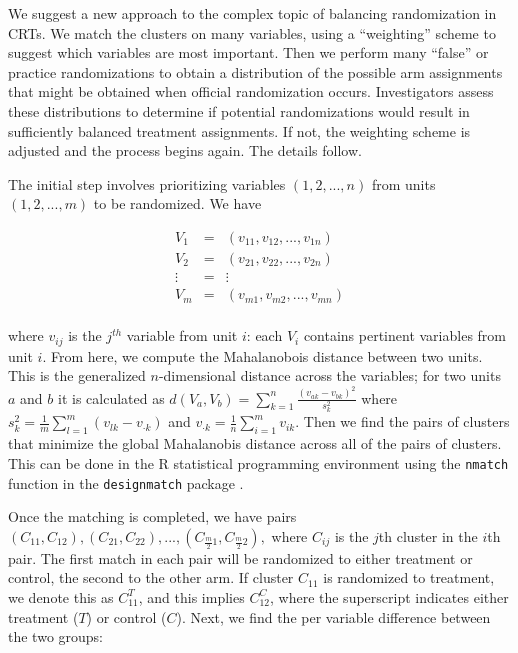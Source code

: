 \documentclass[]{article}
\begin{document}
We suggest a new approach to the complex topic of balancing
randomization in CRTs. We match the clusters on many variables, using a
``weighting'' scheme to suggest which variables are most important. Then
we perform many ``false'' or practice randomizations to obtain a
distribution of the possible arm assignments that might be obtained when
official randomization occurs. Investigators assess these distributions
to determine if potential randomizations would result in sufficiently
balanced treatment assignments. If not, the weighting scheme is adjusted
and the process begins again. The details follow.

The initial step involves prioritizing variables \((1, 2,..., n)\) from
units \((1, 2, ..., m)\) to be randomized. We have

\begin{eqnarray*}
 V_1 & = & (v_{11}, v_{12},..., v_{1n})\\
 V_2 & = & (v_{21}, v_{22},..., v_{2n})\\
 \vdots & = & \vdots\\    
 V_m & = & (v_{m1}, v_{m2},..., v_{mn})\\
\end{eqnarray*}

where \(v_{ij}\) is the \(j^{th}\) variable from unit \(i\): each
\(V_i\) contains pertinent variables from unit \(i\). From here, we
compute the Mahalanobois distance between two units. This is the
generalized \(n\)-dimensional distance across the variables; for two
units \(a\) and \(b\) it is calculated as
\(d(V_a, V_b) = \sum_{k=1}^n \frac{(v_{ak} - v_{bk})^2}{s_k^2}\) where
\(s_k^2 = \frac{1}{m} \sum_{l=1}^m(v_{lk} - v_{\cdot k})\) and
\(v_{\cdot k} = \frac{1}{n} \sum_{i = 1}^m v_{ik}\). Then we find the
pairs of clusters that minimize the global Mahalanobis distance across
all of the pairs of clusters. This can be done in the R statistical
programming environment \citep{R} using the \texttt{nmatch} function in
the \texttt{designmatch} package \citep{nmatch}.

Once the matching is completed, we have pairs
\((C_{11}, C_{12}), (C_{21}, C_{22}), ..., (C_{\frac{m}{2}1}, C_{\frac{m}{2}2}),\)
where \(C_{ij}\) is the \(j\)th cluster in the \(i\)th pair. The first
match in each pair will be randomized to either treatment or control,
the second to the other arm. If cluster \(C_{11}\) is randomized to
treatment, we denote this as \(C_{11}^T\), and this implies
\(C_{12}^C\), where the superscript indicates either treatment (\(T\))
or control (\(C\)). Next, we find the per variable difference between
the two groups:
\end{document}

